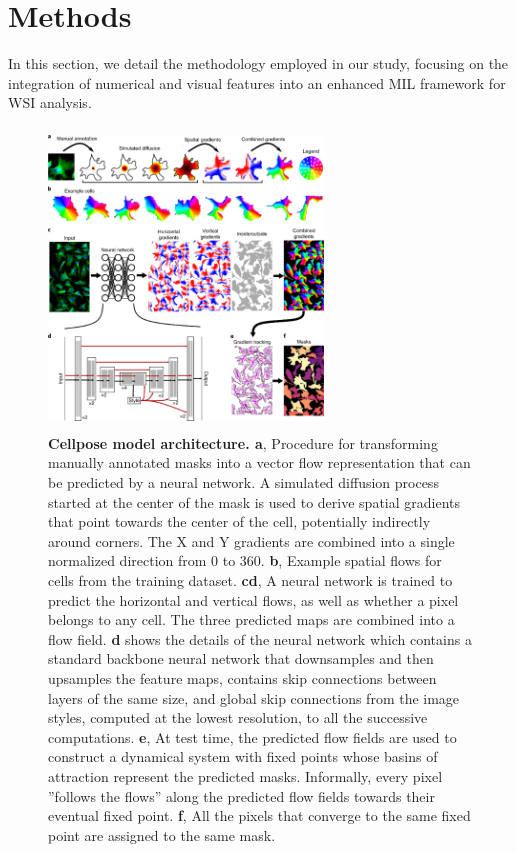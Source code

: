 \documentclass[10pt,twocolumn]{article}
\begin{document}
\section{Methods} \label{methods}

In this section, we detail the methodology employed in our study, focusing on the integration of numerical and visual features into an enhanced MIL framework for WSI analysis.

\begin{figure}[!htb]
\centering
\includegraphics[width=0.65\textwidth, height=8cm]{images/cellpose.png}
\caption{\textbf{Cellpose model architecture. a}, Procedure for transforming manually annotated masks into a vector flow representation that can be predicted
by a neural network. A simulated diffusion process started at the center of the mask is used to derive spatial gradients that point towards the
center of the cell, potentially indirectly around corners. The X and Y gradients are combined into a single normalized direction from 0 to 360.
\textbf{b}, Example spatial flows for cells from the training dataset. \textbf{cd}, A neural network is trained to predict the horizontal and vertical flows, as well
as whether a pixel belongs to any cell. The three predicted maps are combined into a flow field. \textbf{d} shows the details of the neural network
which contains a standard backbone neural network that downsamples and then upsamples the feature maps, contains skip connections
between layers of the same size, and global skip connections from the image styles, computed at the lowest resolution, to all the successive
computations. \textbf{e}, At test time, the predicted flow fields are used to construct a dynamical system with fixed points whose basins of attraction
represent the predicted masks. Informally, every pixel ”follows the flows” along the predicted flow fields towards their eventual fixed point. \textbf{f}, All
the pixels that converge to the same fixed point are assigned to the same mask.} 
\label{cellpose}
\end{figure}
\end{document}

